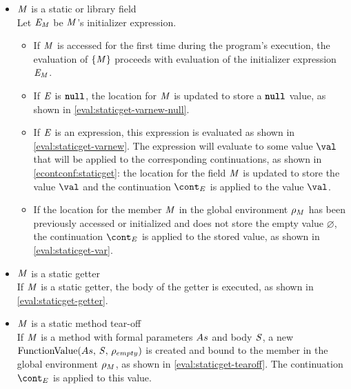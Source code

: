 \documentclass[a4paper,oneside,fleqn]{article}
\renewcommand{\emptyset}{\varnothing}
\newcommand{\synt}[1]{\ensuremath{\text{\textbf{\texttt{#1}}}}}
\DeclareMathOperator{\nnull}{\synt{null}}
\begin{document}
\begin{itemize}
    \item $\mathit{M}$ is a static or library field\\
        Let $\mathit{E}_{\mathit{M}}$ be $\mathit{M}$'s initializer expression.
        \begin{itemize}
            \item If $\mathit{M}$ is accessed for the first time during the program's execution, the evaluation of $\{\mathit{M}\}$ proceeds with evaluation of the initializer expression $\mathit{E}_{\mathit{M}}$.
            \item If $\mathit{E}$ is $\nnull$, the location for $\mathit{M}$ is updated to store a $\nnull$ value, as shown in \eqref{eval:staticget-varnew-null}.
            \item If $\mathit{E}$ is an expression, this expression is evaluated as shown in \eqref{eval:staticget-varnew}.
                The expression will evaluate to some value $\val$ that will be applied to the corresponding continuations, as shown in \eqref{econtconf:staticget}: the location for the field $\mathit{M}$ is updated to store the value $\val$ and the continuation $\econt$ is applied to the value $\val$.
            \item If the location for the member $\mathit{M}$ in the global environment $\rho_{M}$ has been previously accessed or initialized and does not store the empty value $\emptyset$, the continuation $\econt$ is applied to the stored value, as shown in \eqref{eval:staticget-var}.
        \end{itemize}

    \item $\mathit{M}$ is a static getter\\
        If $\mathit{M}$ is a static getter, the body of the getter is executed, as shown in \eqref{eval:staticget-getter}.

    \item $\mathit{M}$ is a static method tear-off\\
        If $\mathit{M}$ is a method with formal parameters $As$ and body $\mathit{S}$, a new $\mathrm{FunctionValue}({As},\,{\mathit{S}},\,{\rho_{empty}})$ is created and bound to the member in the global environment $\rho_{M}$, as shown in \eqref{eval:staticget-tearoff}.
        The continuation $\econt$ is applied to this value.

\end{itemize}
\end{document}
